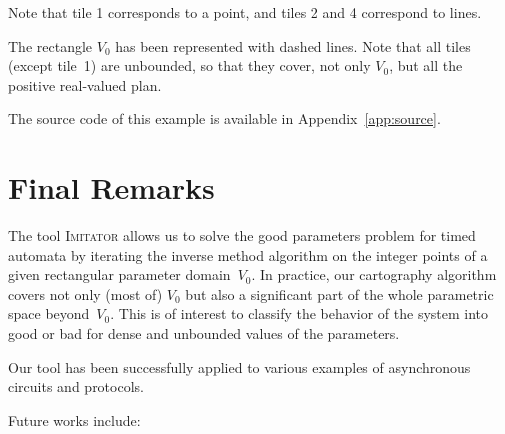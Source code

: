 \documentclass[a4paper,10pt]{article}
\newcommand{\imitator}{\textsc{Imitator}}
\begin{document}
Note that tile 1 corresponds to a point, and tiles 2 and 4 correspond to lines.

The rectangle $V_0$ has been represented with dashed lines.
Note that all tiles (except tile~1) are unbounded, so that they cover, not only $V_0$, but all the positive real-valued plan.


The source code of this example is available in Appendix~\ref{app:source}.


\section{Final Remarks} \label{sec:conclusion}

The tool \imitator{} allows us to solve the good parameters problem for timed automata by iterating the inverse method algorithm on the integer points of a given rectangular parameter domain~$V_0$.
In practice, our cartography algorithm covers not only (most of) $V_0$ but also a significant part of the whole parametric space beyond~$V_0$.
This is of interest to classify the behavior of the system into good or bad for dense and unbounded values of the parameters.

Our tool has been successfully applied to various examples of asynchronous circuits and protocols.

Future works include:
\end{document}
